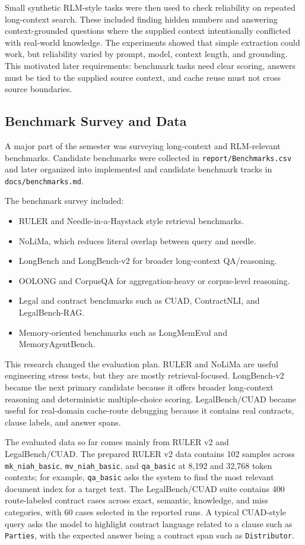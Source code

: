 \documentclass[10pt,a4paper]{article}
\begin{document}
Small synthetic RLM-style tasks were then used to check reliability on repeated long-context search. These included finding hidden numbers and answering context-grounded questions where the supplied context intentionally conflicted with real-world knowledge. The experiments showed that simple extraction could work, but reliability varied by prompt, model, context length, and grounding. This motivated later requirements: benchmark tasks need clear scoring, answers must be tied to the supplied source context, and cache reuse must not cross source boundaries.

\subsection{Benchmark Survey and Data}

A major part of the semester was surveying long-context and RLM-relevant benchmarks. Candidate benchmarks were collected in \texttt{report/Benchmarks.csv} and later organized into implemented and candidate benchmark tracks in \texttt{docs/benchmarks.md}.

The benchmark survey included:

\begin{itemize}
\item RULER and Needle-in-a-Haystack style retrieval benchmarks.
\item NoLiMa, which reduces literal overlap between query and needle.
\item LongBench and LongBench-v2 for broader long-context QA/reasoning.
\item OOLONG and CorpusQA for aggregation-heavy or corpus-level reasoning.
\item Legal and contract benchmarks such as CUAD, ContractNLI, and LegalBench-RAG.
\item Memory-oriented benchmarks such as LongMemEval and MemoryAgentBench.
\end{itemize}

This research changed the evaluation plan. RULER and NoLiMa are useful engineering stress tests, but they are mostly retrieval-focused. LongBench-v2 became the next primary candidate because it offers broader long-context reasoning and deterministic multiple-choice scoring. LegalBench/CUAD became useful for real-domain cache-route debugging because it contains real contracts, clause labels, and answer spans.

The evaluated data so far comes mainly from RULER v2 and LegalBench/CUAD. The prepared RULER v2 data contains 102 samples across \texttt{mk\_niah\_basic}, \texttt{mv\_niah\_basic}, and \texttt{qa\_basic} at 8,192 and 32,768 token contexts; for example, \texttt{qa\_basic} asks the system to find the most relevant document index for a target text. The LegalBench/CUAD suite contains 400 route-labeled contract cases across exact, semantic, knowledge, and miss categories, with 60 cases selected in the reported runs. A typical CUAD-style query asks the model to highlight contract language related to a clause such as \texttt{Parties}, with the expected answer being a contract span such as \texttt{Distributor}.
\end{document}
